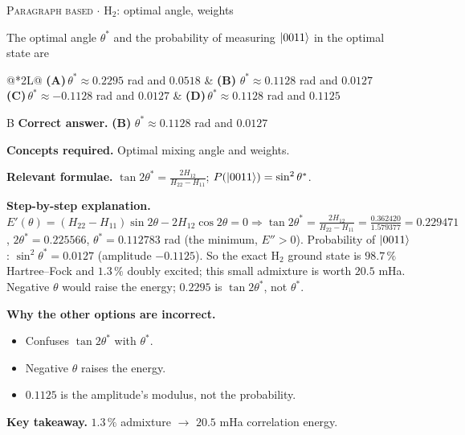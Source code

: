 \documentclass[11pt,a4paper]{article}
\newcommand{\optlabel}[1]{\textbf{(#1)}}
\newcommand{\correctlabel}[1]{\textcolor{okgreen}{\textbf{(#1)}\,\ding{51}}}
\newenvironment{qitem}[1]{\begin{list}{}{\setlength{\leftmargin}{3.3em}\setlength{\labelwidth}{3.1em}%
  \setlength{\labelsep}{0.2em}\setlength{\topsep}{3pt}\setlength{\parsep}{3pt}}\item[\textbf{Q.#1}\hfill]}{\end{list}}
\newcommand{\qsep}{\par\vspace{2pt}{\color{black!15}\hrule}\vspace{4pt}}
\newcommand{\qmeta}[2]{{\footnotesize\color{black!60}\textsc{#1} \;$\cdot$\; #2}\par}
\begin{document}
\begin{qitem}{60}
\qmeta{Paragraph based}{H$_2$: optimal angle, weights}
The optimal angle $\theta^*$ and the probability of measuring $\ket{0011}$ in the optimal state are
\par\smallskip\noindent\begin{tabularx}{\linewidth}{@{}*{2}{L}@{}}
\optlabel{A}\,$\theta^* \approx 0.2295$ rad and $0.0518$ & \correctlabel{B}\,$\theta^* \approx 0.1128$ rad and $0.0127$ \\[3pt]
\optlabel{C}\,$\theta^* \approx -0.1128$ rad and $0.0127$ & \optlabel{D}\,$\theta^* \approx 0.1128$ rad and $0.1125$
\end{tabularx}
\end{qitem}
\begin{solbox}{B}
\textbf{\color{brand}Correct answer.} \textcolor{okgreen}{\textbf{(B)}} $\theta^* \approx 0.1128$ rad and $0.0127$

\textbf{\color{brand}Concepts required.} Optimal mixing angle and weights.

\textbf{\color{brand}Relevant formulae.} $\tan2\theta^* = \frac{2H_{12}}{H_{22} - H_{11}}$; $P(\ket{0011}) = \sin^2\theta^*$.

\textbf{\color{brand}Step-by-step explanation.} $E'(\theta) = (H_{22} - H_{11})\sin2\theta - 2H_{12}\cos2\theta = 0 \Rightarrow \tan2\theta^* = \frac{2H_{12}}{H_{22} - H_{11}} = \frac{0.362420}{1.579377} = 0.229471$,
$2\theta^* = 0.225566$, $\theta^* = 0.112783$ rad (the minimum, $E'' > 0$). Probability of $\ket{0011}$: $\sin^2\theta^* = 0.0127$ (amplitude $-0.1125$).
So the exact H$_2$ ground state is $98.7\,\%$ Hartree--Fock and $1.3\,\%$ doubly excited; this small admixture is worth $20.5$ mHa.
Negative $\theta$ would raise the energy; $0.2295$ is $\tan2\theta^*$, not $\theta^*$.

\textbf{\color{brand}Why the other options are incorrect.}
\begin{itemize}[leftmargin=2.4em, itemsep=1pt, topsep=2pt]
\item[\textbf{(A)}] Confuses $\tan2\theta^*$ with $\theta^*$.
\item[\textbf{(C)}] Negative $\theta$ raises the energy.
\item[\textbf{(D)}] $0.1125$ is the amplitude's modulus, not the probability.
\end{itemize}
\textbf{\color{brand}Key takeaway.} $1.3\,\%$ admixture $\to$ $20.5$ mHa correlation energy.
\end{solbox}
\qsep
\end{document}
